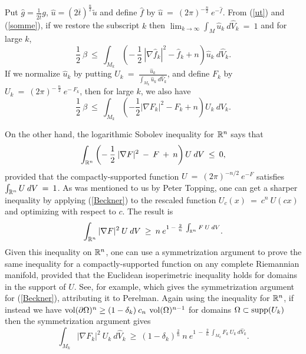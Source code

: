 Put $\widehat{g} = \frac{1}{2\overline{t}} g$,
$\widehat{u} = (2 \overline{t})^{\frac{n}{2}} \widetilde{u}$ and define
$\widehat{f}$ by $\widehat{u} \: = \: (2\pi)^{-\frac{n}{2}} \: e^{-\widehat{f}}$.
From (\ref{ut}) and (\ref{somme}), if we restore the subscript $k$ then
$\lim_{k \rightarrow \infty} \int_M \widehat{u}_k \: d\widehat{V}_k \: = \: 1$ and for large $k$,
\begin{equation}
\frac12 \: \beta \: \le \: \int_{M_k}
\left( - \: \frac12 \: |\nabla \widehat{f}_k|^2 - \widehat{f}_k + n
\right)
\widehat{u}_k \: d\widehat{V}_k.
\end{equation}
If we normalize $\widehat{u}_k$ by putting
$U_k \: = \: \frac{\widehat{u}_k}{\int_{M_k} \widehat{u}_k \: d\widehat{V}_k}$,
and
define $F_k$ by $U_k \: = \: (2\pi)^{- \: \frac{n}{2}} \: e^{- \: F_k}$, then
for large $k$, we also have
\begin{equation} \label{contra1}
\frac12 \: \beta \: \le \: \int_{M_k}
\left( - \frac12 |\nabla {F}_k|^2 - {F}_k + n
\right)
{U}_k \: d\widehat{V}_k.
\end{equation}

On the other hand, the
logarithmic Sobolev inequality for ${\mathbb R}^n$ \cite[I.(8)]{Beckner} says that
\begin{equation} \label{Beckner}
\int_{{\mathbb R}^n} \left( - \: \frac12 \: |\nabla F|^2 \: - \: F \: + \: n \right) U \: dV
\: \le \: 0,
\end{equation}
provided that the compactly-supported function
$U \: = \: (2 \pi)^{-n/2} \: e^{-F}$ satisfies
$\int_{{\mathbb R}^n} U \: dV \: = \: 1$.
As was mentioned to us by Peter Topping, one can get a sharper inequality
by applying (\ref{Beckner}) to the rescaled function
$U_c(x) \: = \: c^n \: U(cx)$ and optimizing with respect to $c$.
The result is
\begin{equation}
\int_{{\mathbb R}^n} |\nabla F|^2 \: U \: dV \: \ge \: n \: e^{1 \: - \: \frac{2}{n} \:
\int_{{\mathbb R}^n} F \: U \: dV}.
\end{equation}
Given this inequality on ${\mathbb R}^n$,
one can use a symmetrization argument to prove the same
inequality for a compactly-supported function on any complete Riemannian
manifold, provided that the Euclidean isoperimetric
inequality holds for domains in the support of $U$.
See, for example, \cite[Proposition 4.1]{Ni3} which gives
the symmetrization argument for
(\ref{Beckner}), attributing it to Perelman.
Again using the inequality for ${\mathbb R}^n$, if instead we have
$\operatorname{vol}(\partial \Omega)^n
\ge (1-\delta_k) \: c_n \: \operatorname{vol}(\Omega)^{n-1}$ for domains
$\Omega \subset \operatorname{supp}(U_k)$ then the symmetrization argument gives
\begin{equation} \label{contra2}
\int_{M_k} |\nabla {F}_k|^2 \: {U}_k \: d\widehat{V}_k \: \ge \:
(1 - \delta_k)^{\frac{2}{n}} \:
n \: e^{1 \: - \: \frac{2}{n} \:
\int_{M_k} {F}_k \: U_k \: d\widehat{V}_k}.
\end{equation}

